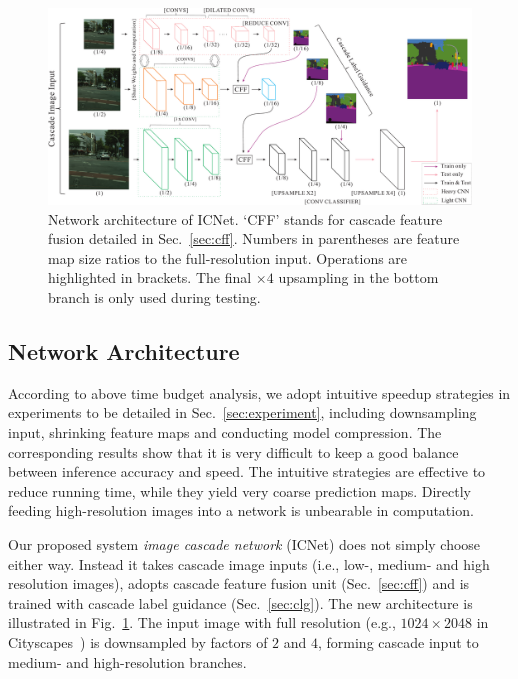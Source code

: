\documentclass[runningheads]{llncs}
\begin{document}
\begin{figure}[t]
	\centering
	\includegraphics[width=0.98\linewidth]{figure/icnet.pdf}
	\caption{Network architecture of ICNet. `CFF' stands for cascade feature fusion detailed in Sec.~\ref{sec:cff}. Numbers in parentheses are feature map size ratios to the full-resolution input. Operations are highlighted in brackets. The final $\times 4$ upsampling in the bottom branch is only used during testing.}
	\label{fig:imagecascadenetwork}
\end{figure}

\subsection{Network Architecture}
According to above time budget analysis, we adopt intuitive speedup strategies in experiments to be detailed in Sec.~\ref{sec:experiment}, including downsampling input, shrinking feature maps and conducting model compression. The corresponding results show that it is very difficult to keep a good balance between inference accuracy and speed. The intuitive strategies are effective to reduce running time, while they yield very coarse prediction maps. Directly feeding high-resolution images into a network is unbearable in computation.

Our proposed system \textit{image cascade network} (ICNet) does not simply choose either way. Instead it takes cascade image inputs (i.e., low-, medium- and high resolution images), adopts cascade feature fusion unit (Sec.~\ref{sec:cff}) and is trained with cascade label guidance (Sec.~\ref{sec:clg}). The new architecture is illustrated in Fig.~\ref{fig:imagecascadenetwork}. 
The input image with full resolution (e.g., $1024 \times 2048$ in Cityscapes~\cite{cordts2016cityscapes}) is downsampled by factors of $2$ and $4$, forming cascade input to medium- and high-resolution branches.
\end{document}
